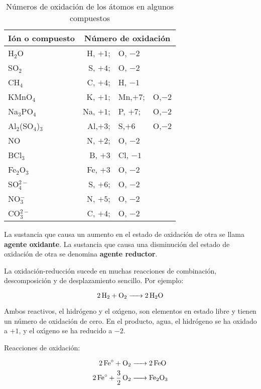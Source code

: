 \begin{table}[hbt]
\caption[N\'umeros de oxidaci\'on]{N\'umeros de oxidaci\'on de los \'atomos en algunos
compuestos}
\begin{center}
{\footnotesize \begin{tabular}{l|rll}\hline 
\textbf{I\'on o compuesto}&\multicolumn{3}{c}{\textbf{N\'umero de oxidaci\'on}}\\ \hline
 H$_2$O &H, $+1$; & O, $-2$   \\ SO$_2$ &S, $+4$; & O, $-2$   \\
CH$_4$ &C, $+4$; & H, $-1$   \\
KMnO$_4$& K, $+1$;& Mn,$+7$;&O,$-2$   \\
Na$_3$PO$_4$ & Na, $+1$;& P, $+7$;& O,$-2$ \\
Al$_2$(SO$_4$)$_3$ &Al,$+3$;&S,$+6$&O,$-2$\\
NO  & N,  $+2$; & O, $-2$   \\
BCl$_3$ &B, $+3$ & Cl, $-1$\\
Fe$_2$O$_3$ &Fe, $+3$ & O, $-2$   \\
SO$_4^{2-}$ &S, $+6$; & O, $-2$  \\
NO$_3^-$  & N,  $+5$; & O, $-2$  \\
CO$_3^{2-}$  & C,  $+4$; & O, $-2$  \\ \hline
\end{tabular}}
\end{center}
\label{tab:6}
\end{table}
La sustancia que causa un aumento en el estado de oxidaci\'on de
otra se llama \textbf{agente oxidante}. La sustancia que causa una
disminuci\'on del estado de oxidaci\'on de otra se denomina
\textbf{agente reductor}.

La oxidaci\'on-reducci\'on sucede en muchas reacciones de combinaci\'on, des\-com\-posici\'on y de desplazamiento sencillo. Por ejemplo:

\begin{equation}
\ce{2H2 +  O2 -> 2H2O} 
\end{equation}

Ambos reactivos, el hidr\'ogeno y el ox\'{\i}geno, son elementos en estado libre y tienen un n\'umero de oxidaci\'on de cero. En el producto, agua, el hidr\'ogeno se ha oxidado a $+1$, y el ox\'{\i}geno se ha reducido a $-2$.

Reacciones de oxidaci\'on:

\begin{eqnarray}
\ce{ 2Fe^{\circ} +O2 ->} & \ce{2FeO}\label{eqfe:1}\\
\ce{ 2Fe^{\circ} + 3/2O2 ->}&\ce{Fe2O3}\label{eqfe:2}
\end{eqnarray}

